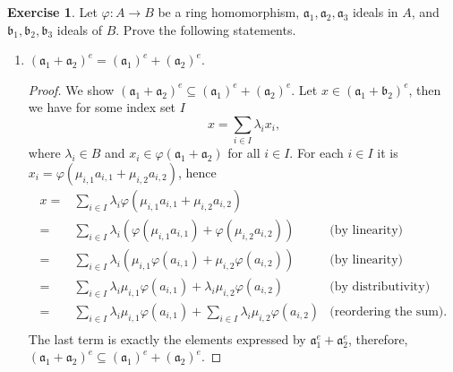 \documentclass{book}
\theoremstyle{plain}
\theoremstyle{definition}
\newtheorem{exr}[thm]{Exercise}
\theoremstyle{custom_definition}
\begin{document}
\begin{exr}
  Let \(\varphi: A \longrightarrow B\) be a ring homomorphism, \(\mathfrak{a}_1, \mathfrak{a}_2, \mathfrak{a}_3\) ideals in \(A\), and \(\mathfrak{b}_1, \mathfrak{b}_2, \mathfrak{b}_3\) ideals of \(B\). Prove the following statements.
  \begin{enumerate}
    \item \((\mathfrak{a}_1 + \mathfrak{a}_2)^e = (\mathfrak{a}_1)^e + (\mathfrak{a}_2)^e\).
    \begin{proof}
      We show \((\mathfrak{a}_1 + \mathfrak{a}_2)^e \subseteq (\mathfrak{a}_1)^e + (\mathfrak{a}_2)^e\). Let \(x \in (\mathfrak{a}_1 + \mathfrak{b}_2)^e\), then we have for some index set \(I\)
      \begin{equation}
        x = \sum_{i \in I} \lambda_i x_i \text{,}
      \end{equation}
      where \(\lambda_i \in B\) and \(x_i \in \varphi(\mathfrak{a}_1 + \mathfrak{a}_2)\) for all \(i \in I\). For each \(i \in I\) it is \(x_i = \varphi(\mu_{i, 1} a_{i, 1} + \mu_{i, 2} a_{i, 2})\), hence
      \begin{align}
        x =& \sum_{i \in I} \lambda_i \varphi(\mu_{i, 1} a_{i, 1} + \mu_{i, 2} a_{i, 2}) &  \\
        =& \sum_{i \in I} \lambda_i \left( \varphi(\mu_{i, 1} a_{i, 1}) + \varphi(\mu_{i, 2} a_{i, 2}) \right)&\text{(by linearity)} \\
        =& \sum_{i \in I} \lambda_i \left( \mu_{i, 1} \varphi( a_{i, 1}) + \mu_{i, 2} \varphi( a_{i, 2}) \right)&\text{(by linearity)} \\
        =& \sum_{i \in I} \lambda_i \mu_{i, 1}\varphi( a_{i, 1}) + \lambda_i \mu_{i, 2}\varphi( a_{i, 2}) & \text{(by distributivity)} \\
        =& \sum_{i \in I} \lambda_i \mu_{i, 1} \varphi( a_{i, 1}) + \sum_{i \in I} \lambda_i \mu_{i, 2} \varphi( a_{i, 2}) & \text{(reordering the sum)} \text{.} \\
      \end{align}
      The last term is exactly the elements expressed by \(\mathfrak{a}_1^e + \mathfrak{a}_2^e\), therefore, \((\mathfrak{a}_1 + \mathfrak{a}_2)^e \subseteq (\mathfrak{a}_1)^e + (\mathfrak{a}_2)^e\).


\end{proof}
\end{enumerate}
\end{exr}
\end{document}
